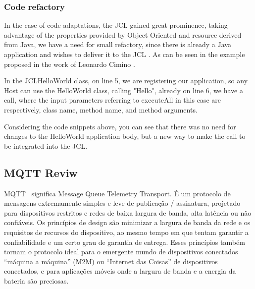 \documentclass[12pt]{article}
\begin{document}

\subsubsection{Code refactory}

In the case of code adaptations, the JCL gained great prominence, taking advantage of the properties provided by Object Oriented and resource derived from Java, we have a need for small refactory, since there is already a Java application and wishes to deliver it to the JCL . As can be seen in the example proposed in the work of Leonardo Cimino \cite{Cimino2018}.





In the JCLHelloWorld class, on line 5, we are registering our application, so any Host can use the HelloWorld class, calling "Hello", already on line 6, we have a call, where the input parameters referring to executeAll in this case are respectively, class name, method name, and method arguments.

Considering the code snippets above, you can see that there was no need for changes to the HelloWorld application body, but a new way to make the call to be integrated into the JCL.
\subsection{MQTT Reviw}
MQTT~\cite{mqtt} significa Message Queue Telemetry Transport. É um protocolo de mensagens extremamente simples e leve de publicação / assinatura, projetado para dispositivos restritos e redes de baixa largura de banda, alta latência ou não confiáveis. Os princípios de design são minimizar a largura de banda da rede e os requisitos de recursos do dispositivo, ao mesmo tempo em que tentam garantir a confiabilidade e um certo grau de garantia de entrega. Esses princípios também tornam o protocolo ideal para o emergente mundo de dispositivos conectados “máquina a máquina” (M2M) ou “Internet das Coisas” de dispositivos conectados, e para aplicações móveis onde a largura de banda e a energia da bateria são preciosas.
\end{document}
